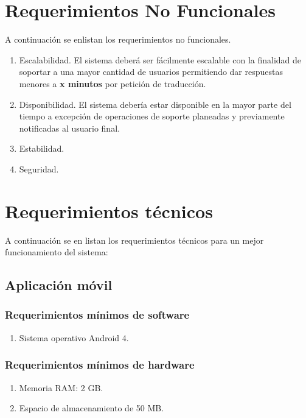 \section{Requerimientos No Funcionales} 
    A continuación se enlistan los requerimientos no funcionales.
        \begin{enumerate}[label=RNF\arabic*.]
            \item Escalabilidad. El sistema deberá ser fácilmente escalable con la finalidad de soportar a una mayor cantidad de usuarios permitiendo dar respuestas menores a \textbf{x minutos} por petición de traducción.

            \item Disponibilidad. El sistema debería estar disponible en la mayor parte del tiempo a excepción de operaciones de soporte planeadas y previamente notificadas al usuario final.
    
            \item Estabilidad.
            
            \item Seguridad.
            
            
        \end{enumerate}    
\section{Requerimientos técnicos}
    A continuación se en listan los requerimientos técnicos para un mejor funcionamiento del sistema:
    \subsection{Aplicación móvil}
    \subsubsection{Requerimientos mínimos de software}
    \begin{enumerate}
        \item Sistema operativo Android 4.
    \end{enumerate}
    
    \subsubsection{Requerimientos mínimos de hardware}
    \begin{enumerate}
        \item Memoria RAM: 2 GB.
        \item Espacio de almacenamiento de 50 MB.
    \end{enumerate}
